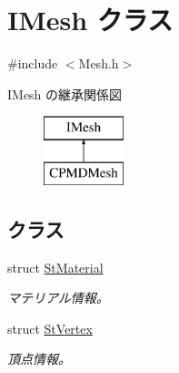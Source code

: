 \hypertarget{class_i_mesh}{}\section{I\+Mesh クラス}
\label{class_i_mesh}


{\ttfamily \#include $<$Mesh.\+h$>$}

I\+Mesh の継承関係図\begin{figure}[H]
\begin{center}
\leavevmode
\includegraphics[height=2.000000cm]{class_i_mesh}
\end{center}
\end{figure}
\subsection*{クラス}
\begin{DoxyCompactItemize}
\item 
struct \hyperlink{struct_i_mesh_1_1_st_material}{St\+Material}
\begin{DoxyCompactList}\small\item\em マテリアル情報。 \end{DoxyCompactList}\item 
struct \hyperlink{struct_i_mesh_1_1_st_vertex}{St\+Vertex}
\begin{DoxyCompactList}\small\item\em 頂点情報。 \end{DoxyCompactList}\end{DoxyCompactItemize}

